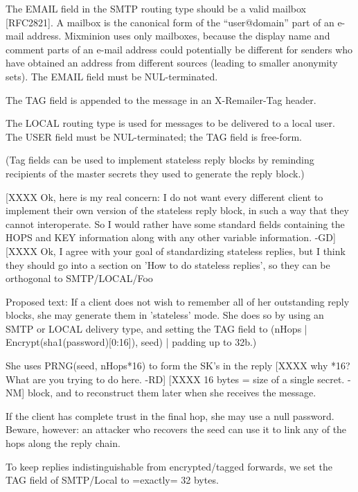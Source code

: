 The EMAIL field in the SMTP routing type should be a valid mailbox
[RFC2821]. A mailbox is the canonical form of the ``user@domain''
part of an e-mail address. Mixminion uses only mailboxes, because the
display name and comment parts of an e-mail address could potentially be
different for senders who have obtained an address from different
sources (leading to smaller anonymity sets). The EMAIL field must be
NUL-terminated.

The TAG field is appended to the message in an X-Remailer-Tag header.

The LOCAL routing type is used for messages to be delivered to a local
user.  The USER field must be NUL-terminated; the TAG field is
free-form.

(Tag fields can be used to implement stateless reply blocks by
reminding recipients of the master secrets they used to generate the
reply block.)

[XXXX Ok, here is my real concern: I do not want every different client
      to implement their own version of the stateless reply block, in
such a way that they cannot interoperate. So I would rather have some 
standard fields containing the HOPS and KEY information along with any
other variable information. -GD]
[XXXX Ok, I agree with your goal of standardizing stateless replies,
      but I think they should go into a section on 'How to do
      stateless replies', so they can be orthogonal to SMTP/LOCAL/Foo  

      Proposed text:
         If a client does not wish to remember all of her outstanding
         reply blocks, she may generate them in 'stateless' mode.  She  
         does so by using an SMTP or LOCAL delivery type, and setting
         the TAG field to 
           (nHops | Encrypt(sha1(password)[0:16]), seed) | padding up to 32b.)

         She uses PRNG(seed, nHops*16) to form the SK's in the reply
[XXXX why *16? What are you trying to do here. -RD]
[XXXX 16 bytes = size of a single secret. -NM]
         block, and to reconstruct them later when she receives the 
         message.
       
         If the client has complete trust in the final hop, she may
         use a null password.  Beware, however: an attacker who recovers 
         the seed can use it to link any of the hops along the reply 
         chain.

	 To keep replies indistinguishable from encrypted/tagged
         forwards, we set the TAG field of SMTP/Local to =exactly=
         32 bytes.

